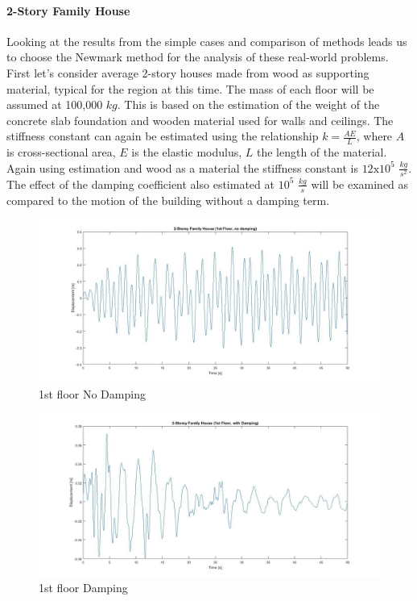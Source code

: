 \documentclass{article}
\begin{document}
	\paragraph{2-Story Family House} Looking at the results from the simple cases and comparison of methods leads us to choose the Newmark method for the analysis of these real-world problems. First let's consider average 2-story houses made from wood as supporting material, typical for the region at this time. The mass of each floor will be assumed at 100,000 $kg$. This is based on the estimation of the weight of the concrete slab foundation and wooden material used for walls and ceilings. The stiffness constant can again be estimated using the relationship $k = \frac{AE}{L}$, where $A$ is cross-sectional area, $E$ is the elastic modulus, $L$ the length of the material. Again using estimation and wood as a material the stiffness constant is $12\text{x}10^5$ $\frac{kg}{s^2}$. The effect of the damping coefficient also estimated at $10^5$ $\frac{kg}{s}$ will be examined as compared to the motion of the building without a damping term. 

				\begin{figure}[h!]
   					\centering
   					\includegraphics[width=142mm]{FM1.jpg}
					\caption{1st floor No Damping}
					\label{FM1}
  				\end{figure}

				\begin{figure}[h!]
   					\centering
					\includegraphics[width=142mm]{FMD1.jpg}
					\caption{1st floor Damping}
					\label{FMD1}
  				\end{figure}
\end{document}
